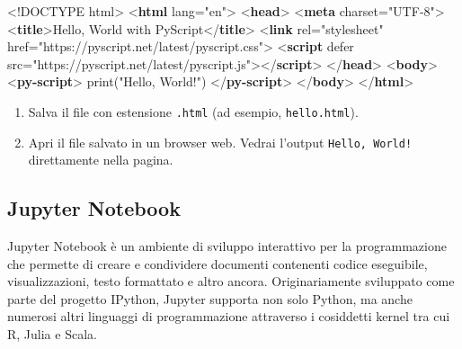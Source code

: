 \documentclass[
  letterpaper,
  DIV=11,
  numbers=noendperiod]{scrreprt}
\newenvironment{Shaded}{\begin{snugshade}}{\end{snugshade}}
\newcommand{\DataTypeTok}[1]{\textcolor[rgb]{0.68,0.00,0.00}{#1}}
\newcommand{\KeywordTok}[1]{\textcolor[rgb]{0.00,0.23,0.31}{\textbf{#1}}}
\newcommand{\NormalTok}[1]{\textcolor[rgb]{0.00,0.23,0.31}{#1}}
\newcommand{\OperatorTok}[1]{\textcolor[rgb]{0.37,0.37,0.37}{#1}}
\newcommand{\OtherTok}[1]{\textcolor[rgb]{0.00,0.23,0.31}{#1}}
\newcommand{\StringTok}[1]{\textcolor[rgb]{0.13,0.47,0.30}{#1}}
\providecommand{\tightlist}{%
  \setlength{\itemsep}{0pt}\setlength{\parskip}{0pt}}\usepackage{longtable,booktabs,array}
\begin{document}
\begin{Shaded}
\begin{Highlighting}[]
\DataTypeTok{\textless{}!DOCTYPE}\NormalTok{ html}\DataTypeTok{\textgreater{}}
\DataTypeTok{\textless{}}\KeywordTok{html}\OtherTok{ lang}\OperatorTok{=}\StringTok{"en"}\DataTypeTok{\textgreater{}}
\DataTypeTok{\textless{}}\KeywordTok{head}\DataTypeTok{\textgreater{}}
    \DataTypeTok{\textless{}}\KeywordTok{meta}\OtherTok{ charset}\OperatorTok{=}\StringTok{"UTF{-}8"}\DataTypeTok{\textgreater{}}
    \DataTypeTok{\textless{}}\KeywordTok{title}\DataTypeTok{\textgreater{}}\NormalTok{Hello, World with PyScript}\DataTypeTok{\textless{}/}\KeywordTok{title}\DataTypeTok{\textgreater{}}
    \DataTypeTok{\textless{}}\KeywordTok{link}\OtherTok{ rel}\OperatorTok{=}\StringTok{"stylesheet"}\OtherTok{ href}\OperatorTok{=}\StringTok{"https://pyscript.net/latest/pyscript.css"}\DataTypeTok{\textgreater{}}
    \DataTypeTok{\textless{}}\KeywordTok{script}\OtherTok{ defer src}\OperatorTok{=}\StringTok{"https://pyscript.net/latest/pyscript.js"}\DataTypeTok{\textgreater{}\textless{}/}\KeywordTok{script}\DataTypeTok{\textgreater{}}
\DataTypeTok{\textless{}/}\KeywordTok{head}\DataTypeTok{\textgreater{}}
\DataTypeTok{\textless{}}\KeywordTok{body}\DataTypeTok{\textgreater{}}
    \DataTypeTok{\textless{}}\KeywordTok{py{-}script}\DataTypeTok{\textgreater{}}
\NormalTok{        print("Hello, World!")}
    \DataTypeTok{\textless{}/}\KeywordTok{py{-}script}\DataTypeTok{\textgreater{}}
\DataTypeTok{\textless{}/}\KeywordTok{body}\DataTypeTok{\textgreater{}}
\DataTypeTok{\textless{}/}\KeywordTok{html}\DataTypeTok{\textgreater{}}
\end{Highlighting}
\end{Shaded}

\begin{enumerate}
\def\labelenumi{\arabic{enumi}.}
\setcounter{enumi}{2}
\tightlist
\item
  Salva il file con estensione \texttt{.html} (ad esempio,
  \texttt{hello.html}).
\item
  Apri il file salvato in un browser web. Vedrai l'output
  \texttt{Hello,\ World!} direttamente nella pagina.
\end{enumerate}

\subsection{Jupyter Notebook}\label{jupyter-notebook}

Jupyter Notebook è un ambiente di sviluppo interattivo per la
programmazione che permette di creare e condividere documenti contenenti
codice eseguibile, visualizzazioni, testo formattato e altro ancora.
Originariamente sviluppato come parte del progetto IPython, Jupyter
supporta non solo Python, ma anche numerosi altri linguaggi di
programmazione attraverso i cosiddetti kernel tra cui R, Julia e Scala.
\end{document}
